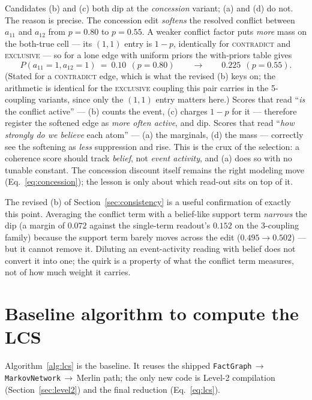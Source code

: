 \documentclass[11pt]{article}
\begin{document}
Candidates (b) and (c) both dip at the \emph{concession} variant; (a) and (d) do not. The
reason is precise. The concession edit \emph{softens} the resolved conflict between $a_{11}$
and $a_{12}$ from $p{=}0.80$ to $p{=}0.55$. A weaker conflict factor puts \emph{more} mass on
the both-true cell --- its $(1,1)$ entry is $1{-}p$, identically for \textsc{contradict} and
\textsc{exclusive} --- so for a lone edge with uniform priors the with-priors table gives
\[
  P(a_{11}{=}1,a_{12}{=}1)\ =\ 0.10\ \ (p{=}0.80)\qquad\longrightarrow\qquad 0.225\ \ (p{=}0.55).
\]
(Stated for a \textsc{contradict} edge, which is what the revised (b) keys on; the arithmetic
is identical for the \textsc{exclusive} coupling this pair carries in the 5-coupling variants,
since only the $(1,1)$ entry matters here.)
Scores that read ``\emph{is} the conflict active'' --- (b) counts the event, (c) charges
$1{-}p$ for it --- therefore register the softened edge as \emph{more often active}, and dip.
Scores that read ``\emph{how strongly do we believe} each atom'' --- (a) the marginals, (d)
the mass --- correctly see the softening as \emph{less} suppression and rise. This is the
crux of the selection: a coherence score should track \emph{belief}, not \emph{event
activity}, and (a) does so with no tunable constant. The concession discount itself remains
the right modeling move (Eq.~\ref{eq:concession}); the lesson is only about which read-out
sits on top of it.

The revised (b) of Section~\ref{sec:consistency} is a useful confirmation of exactly this
point. Averaging the conflict term with a belief-like support term \emph{narrows} the dip
(a margin of $0.072$ against the single-term readout's $0.152$ on the 3-coupling family)
because the support term barely moves across the edit ($0.495\to0.502$) --- but it cannot
remove it. Diluting an event-activity reading with belief does not convert it into one; the
quirk is a property of what the conflict term measures, not of how much weight it carries.

\section{Baseline algorithm to compute the LCS}
\label{sec:algo}

Algorithm~\ref{alg:lcs} is the baseline. It reuses the shipped
\texttt{FactGraph}\,$\to$\,\texttt{MarkovNetwork}\,$\to$\,Merlin path; the only new code is
Level-2 compilation (Section~\ref{sec:level2}) and the final reduction
(Eq.~\eqref{eq:lcs}).
\end{document}
